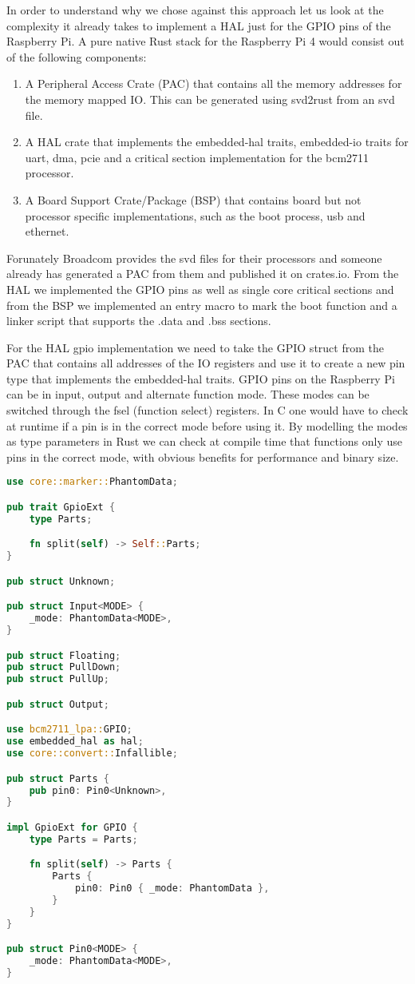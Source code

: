 In order to understand why we chose against this approach let us look at the complexity it already takes to implement a HAL just for the GPIO pins of the Raspberry Pi.
A pure native Rust stack for the Raspberry Pi 4 would consist out of the following components:
\begin{enumerate}
    \item A Peripheral Access Crate (PAC) that contains all the memory addresses for the memory mapped IO. This can be generated using svd2rust from an svd file.
    \item A HAL crate that implements the embedded-hal traits, embedded-io traits for uart, dma, pcie and a critical section implementation for the bcm2711 processor.
    \item A Board Support Crate/Package (BSP) that contains board but not processor specific implementations, such as the boot process, usb and ethernet.
\end{enumerate}

Forunately Broadcom provides the svd files for their processors and someone already has generated a PAC from them and published it on crates.io.
From the HAL we implemented the GPIO pins as well as single core critical sections and from the BSP we implemented an entry macro to mark the boot function and a linker script that supports the .data and .bss sections.

For the HAL gpio implementation we need to take the GPIO struct from the PAC that contains all addresses of the IO registers and use it to create a new pin type that implements the embedded-hal traits.
GPIO pins on the Raspberry Pi can be in input, output and alternate function mode. These modes can be switched through the fsel (function select) registers.
In C one would have to check at runtime if a pin is in the correct mode before using it.
By modelling the modes as type parameters in Rust we can check at compile time that functions only use pins in the correct mode, with obvious benefits for performance and binary size.

\begin{lstlisting}[language=Rust,style=colouredRust]
use core::marker::PhantomData;

pub trait GpioExt {
    type Parts;

    fn split(self) -> Self::Parts;
}

pub struct Unknown;

pub struct Input<MODE> {
    _mode: PhantomData<MODE>,
}

pub struct Floating;
pub struct PullDown;
pub struct PullUp;

pub struct Output;

use bcm2711_lpa::GPIO;
use embedded_hal as hal;
use core::convert::Infallible;

pub struct Parts {
    pub pin0: Pin0<Unknown>,
}

impl GpioExt for GPIO {
    type Parts = Parts;

    fn split(self) -> Parts {
        Parts {
            pin0: Pin0 { _mode: PhantomData },
        }
    }
}

pub struct Pin0<MODE> {
    _mode: PhantomData<MODE>,
}
\end{lstlisting}

